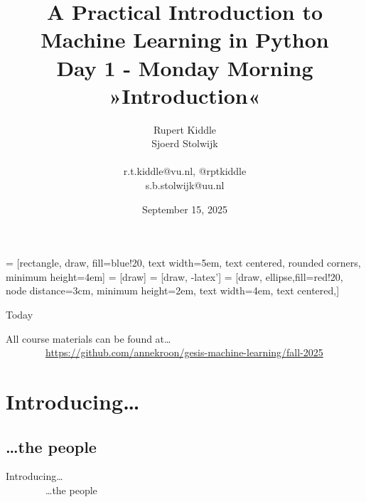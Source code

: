 \documentclass[compress]{beamer}
\title[Big Data and Automated Content Analysis]{\textbf{A Practical Introduction to Machine Learning in Python} \\Day 1 - Monday  Morning\\ »Introduction«}
\author[Rupert Kiddle, Sjoerd Stolwijk]{Rupert Kiddle \\ Sjoerd Stolwijk \\ ~ \\ \footnotesize{r.t.kiddle@vu.nl, @rptkiddle \\ s.b.stolwijk@uu.nl} \\}
\date{September 15, 2025}
\institute[Gesis]{Gesis}
\begin{document}
 = [rectangle, draw, fill=blue!20, 
text width=5em, text centered, rounded corners, minimum height=4em]
 = [draw]
 = [draw, -latex']
 = [draw, ellipse,fill=red!20, node distance=3cm,
minimum height=2em, text width=4em, text centered,]




\begin{frame}{}
\titlepage
\end{frame}

\begin{frame}{Today}
\tableofcontents
\end{frame}


\begin{frame} 
All course materials can be found at\ldots \\
~~~~~~~~\url{https://github.com/annekroon/gesis-machine-learning/fall-2025}
\end{frame}

\section{Introducing\ldots}
\subsection{\ldots the people}

\begin{frame} 
Introducing\ldots \\
~~~~~~~~\ldots the people
\end{frame}
\end{document}
